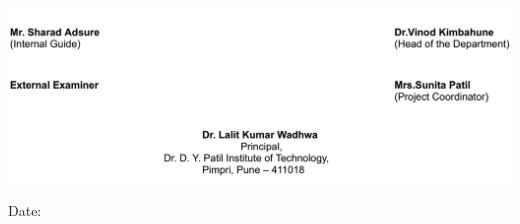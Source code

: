 \documentclass[12pt]{report}
\begin{document}
\setlength{\parindent}{-1.05em}
\setlength{\parskip}{-1.05em}
\includegraphics[scale=0.85]{firstPage-1.png}


\begin{flushleft}
Date:
\end{flushleft}

\thispagestyle{empty}
\clearpage
\end{document}
